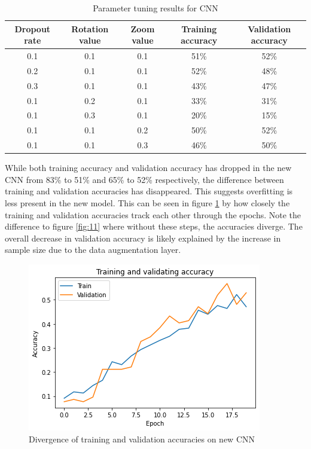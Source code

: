 \documentclass[10pt,a4paper]{article}
\begin{document}
\begin{table}[H]
\centering
\begin{tabular}{|c|c|c|c|c|}
	\hline
	Dropout rate & Rotation value & Zoom value & Training accuracy & Validation accuracy \\
	\hline
	0.1 & 0.1 & 0.1 & 51\% & 52\% \\
	\hline
	0.2 & 0.1 & 0.1 & 52\% & 48\% \\
	\hline
	0.3 & 0.1 & 0.1 & 43\% & 47\% \\
	\hline
	0.1 & 0.2 & 0.1 & 33\% & 31\% \\
	\hline
	0.1 & 0.3 & 0.1 & 20\% & 15\% \\
	\hline
	0.1 & 0.1 & 0.2 & 50\% & 52\% \\
	\hline
	0.1 & 0.1 & 0.3 & 46\% & 50\% \\
	\hline
\end{tabular}
\caption{Parameter tuning results for CNN}
\label{Tab:ra}
\end{table}

While both training accuracy and validation accuracy has dropped in the new CNN from 83\% to 51\% and 65\% to 52\% respectively, the difference between training and validation accuracies has disappeared. This suggests overfitting is less present in the new model. This can be seen in figure \ref{fig:12} by how closely the training and validation accuracies track each other through the epochs. Note the difference to figure \ref{fig:11} where without these steps, the accuracies diverge. The overall decrease in validation accuracy is likely explained by the increase in sample size due to the data augmentation layer.

\begin{figure}[H]
	\centering
	\includegraphics[width=0.7\linewidth]{images/12}
	\caption{Divergence of training and validation accuracies on new CNN}
	\label{fig:12}
\end{figure}
\end{document}
